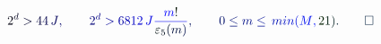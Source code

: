 \documentclass[12pt]{article}
\begin{document}
\makeatletter
\renewcommand*{\@textcolor}[3]{%
  \protect\leavevmode
  \begingroup
    \color#1{#2}#3%
  \endgroup
}
\makeatother
\begin{displaymath}
\mathcolor[RGB]{0,0,15}{2} ^ { \mathcolor[RGB]{0,0,30}{d} } \mathcolor[RGB]{0,0,45}{>} \mathcolor[RGB]{0,0,60}{4} \mathcolor[RGB]{0,0,75}{4} \, \mathcolor[RGB]{0,0,90}{J} \mathcolor[RGB]{0,0,105}{,} \qquad \mathcolor[RGB]{0,0,120}{2} ^ { \mathcolor[RGB]{0,0,135}{d} } \mathcolor[RGB]{0,0,150}{>} \mathcolor[RGB]{0,0,165}{6} \mathcolor[RGB]{0,0,180}{8} \mathcolor[RGB]{0,0,195}{1} \mathcolor[RGB]{0,0,210}{2} \, \mathcolor[RGB]{0,0,225}{J} \mathcolor[RGB]{0,0,240}{\frac { \mathcolor[RGB]{0,0,255}{m} \mathcolor[RGB]{0,15,0}{!} } { \mathcolor[RGB]{0,15,15}{\varepsilon} _ { \mathcolor[RGB]{0,15,30}{5} } \mathcolor[RGB]{0,15,45}{(} \mathcolor[RGB]{0,15,60}{m} \mathcolor[RGB]{0,15,75}{)} } } \mathcolor[RGB]{0,15,90}{,} \qquad \mathcolor[RGB]{0,15,105}{0} \mathcolor[RGB]{0,15,120}{\le} \mathcolor[RGB]{0,15,135}{m} \mathcolor[RGB]{0,15,150}{\le} \mathcolor[RGB]{0,15,165}{\operatorname*} { \mathcolor[RGB]{0,15,180}{m} \mathcolor[RGB]{0,15,195}{i} \mathcolor[RGB]{0,15,210}{n} } \mathcolor[RGB]{0,15,225}{(} \mathcolor[RGB]{0,15,240}{M} \mathcolor[RGB]{0,15,255}{,} \mathcolor[RGB]{0,30,0}{2} \mathcolor[RGB]{0,30,15}{1} \mathcolor[RGB]{0,30,30}{)} \mathcolor[RGB]{0,30,45}{.} \mathcolor[RGB]{0,30,60}{\qedhere}
\end{displaymath}
\end{document}
